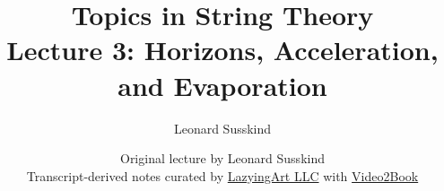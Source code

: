 \documentclass[11pt,oneside]{book}
\begin{document}
\frontmatter
\title{Topics in String Theory\\[0.5em]
\large Lecture 3: Horizons, Acceleration, and Evaporation}
\author{Leonard Susskind}
\date{Original lecture by Leonard Susskind\\[0.4em]
Transcript-derived notes curated by
\href{https://lazying.art}{LazyingArt LLC} with
\href{https://github.com/lachlanchen/Video2Book}{Video2Book}}
\maketitle
\mainmatter

\end{document}
